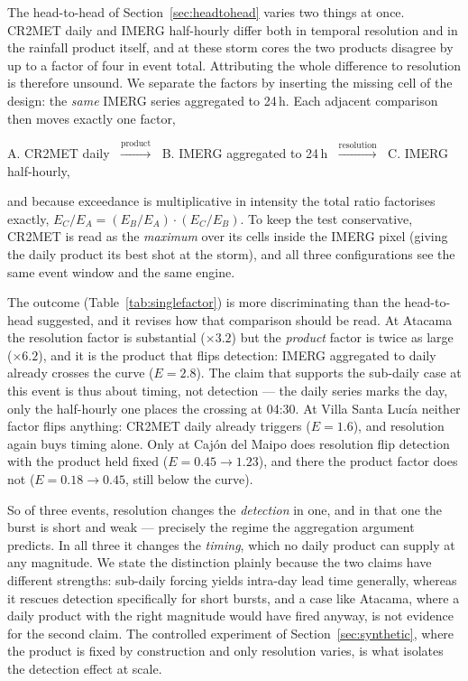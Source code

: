 \documentclass[authoryear,preprint,review,12pt]{elsarticle}
\begin{document}
The head-to-head of Section~\ref{sec:headtohead} varies two things at once. CR2MET
daily and IMERG half-hourly differ both in temporal resolution and in the rainfall
product itself, and at these storm cores the two products disagree by up to a
factor of four in event total. Attributing the whole difference to resolution is
therefore unsound. We separate the factors by inserting the missing cell of the
design: the \emph{same} IMERG series aggregated to 24\,h. Each adjacent comparison
then moves exactly one factor,
\begin{center}
A. CR2MET daily $\;\xrightarrow{\text{product}}\;$ B. IMERG aggregated to 24\,h
$\;\xrightarrow{\text{resolution}}\;$ C. IMERG half-hourly,
\end{center}
and because exceedance is multiplicative in intensity the total ratio factorises
exactly, $E_C/E_A = (E_B/E_A)\cdot(E_C/E_B)$. To keep the test conservative, CR2MET
is read as the \emph{maximum} over its cells inside the IMERG pixel (giving the
daily product its best shot at the storm), and all three configurations see the same
event window and the same engine.

The outcome (Table~\ref{tab:singlefactor}) is more discriminating than the
head-to-head suggested, and it revises how that comparison should be read. At
Atacama the resolution factor is substantial ($\times3.2$) but the \emph{product}
factor is twice as large ($\times6.2$), and it is the product that flips detection:
IMERG aggregated to daily already crosses the curve ($E=2.8$). The claim that
supports the sub-daily case at this event is thus about timing, not detection ---
the daily series marks the day, only the half-hourly one places the crossing at
04:30. At Villa Santa Luc\'ia neither factor flips anything: CR2MET daily already
triggers ($E=1.6$), and resolution again buys timing alone. Only at Caj\'on del
Maipo does resolution flip detection with the product held fixed
($E=0.45\to1.23$), and there the product factor does not ($E=0.18\to0.45$, still
below the curve).

So of three events, resolution changes the \emph{detection} in one, and in that one
the burst is short and weak --- precisely the regime the aggregation argument
predicts. In all three it changes the \emph{timing}, which no daily product can
supply at any magnitude. We state the distinction plainly because the two claims
have different strengths: sub-daily forcing yields intra-day lead time generally,
whereas it rescues detection specifically for short bursts, and a case like
Atacama, where a daily product with the right magnitude would have fired anyway, is
not evidence for the second claim. The controlled experiment of
Section~\ref{sec:synthetic}, where the product is fixed by construction and only
resolution varies, is what isolates the detection effect at scale.
\end{document}
